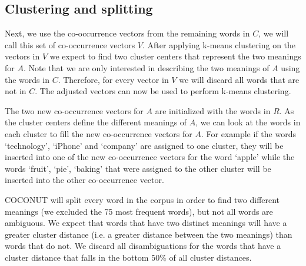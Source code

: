 \documentclass[11pt]{article}
\begin{document}
\subsection{Clustering and splitting}
Next, we use the co-occurrence vectors from the remaining words in $C$, we will call this set of co-occurrence vectors $V$. After applying k-means clustering on the vectors in $V$ we expect to find two cluster centers that represent the two meanings for $A$. Note that we are only interested in describing the two meanings of $A$ using the words in $C$. Therefore, for every vector in $V$ we will discard all words that are not in $C$. The adjusted vectors can now be used to perform k-means clustering. 

The two new co-occurrence vectors for $A$ are initialized with the words in $R$. As the cluster centers define the different meanings of $A$, we can look at the words in each cluster to fill the new co-occurrence vectors for $A$. For example if the words `technology', `iPhone' and `company' are assigned to one cluster, they will be inserted into one of the new co-occurrence vectors for the word `apple' while the words `fruit', `pie', `baking' that were assigned to the other cluster will be inserted into the other co-occurrence vector. 

COCONUT will split every word in the corpus in order to find two different meanings (we excluded the 75 most frequent words), but not all words are ambiguous. We expect that words that have two distinct meanings will have a greater cluster distance (i.e. a greater distance between the two meanings) than words that do not. We discard all disambiguations for the words that have a cluster distance that falls in the bottom $50\%$ of all cluster distances.


\end{document}
